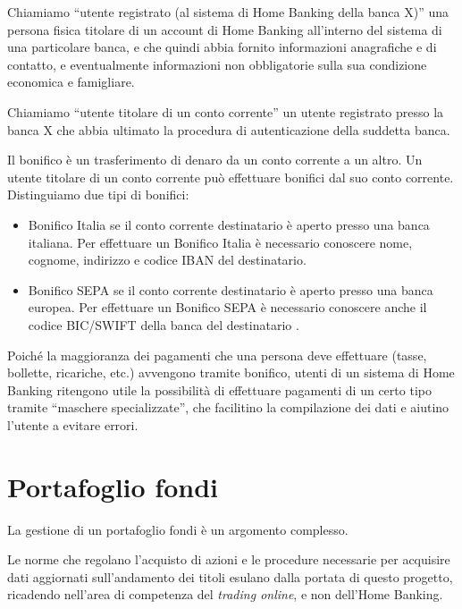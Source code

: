 \documentclass[]{softeng}
\begin{document}
Chiamiamo ``utente registrato (al sistema di Home Banking della banca X)'' una persona fisica titolare di un account di Home Banking all'interno del sistema di una particolare banca, e che quindi abbia fornito informazioni anagrafiche e di contatto, e eventualmente informazioni non obbligatorie sulla sua condizione economica e famigliare.

Chiamiamo ``utente titolare di un conto corrente'' un utente registrato presso la banca X che abbia ultimato la procedura di autenticazione della suddetta banca.

Il bonifico \`e un trasferimento di denaro da un conto corrente a un altro.
Un utente titolare di un conto corrente pu\`o effettuare bonifici dal suo conto corrente.
Distinguiamo due tipi di bonifici:
\begin{itemize}
	\item Bonifico Italia se il conto corrente destinatario \`e aperto presso una banca italiana.
	Per effettuare un Bonifico Italia \`e necessario conoscere nome, cognome, indirizzo e codice IBAN del destinatario.
	\item Bonifico SEPA se il conto corrente destinatario \`e aperto presso una banca europea. Per effettuare un Bonifico SEPA \`e necessario conoscere anche il codice BIC/SWIFT della banca del destinatario \cite{bonifico_unicredit}.
\end{itemize}
Poich\'e la maggioranza dei pagamenti che una persona deve effettuare (tasse, bollette, ricariche, etc.) avvengono tramite bonifico, utenti di un sistema di Home Banking ritengono utile la possibilit\`a di effettuare pagamenti di un certo tipo tramite ``maschere specializzate'', che facilitino la compilazione dei dati e aiutino l'utente a evitare errori.



\section{Portafoglio fondi}

La gestione di un portafoglio fondi \`e un argomento complesso.

Le norme che regolano l'acquisto di azioni e le procedure necessarie per acquisire dati aggiornati sull'andamento dei titoli esulano dalla portata di questo progetto, ricadendo nell'area di competenza del \emph{trading online}, e non dell'Home Banking.
\end{document}
